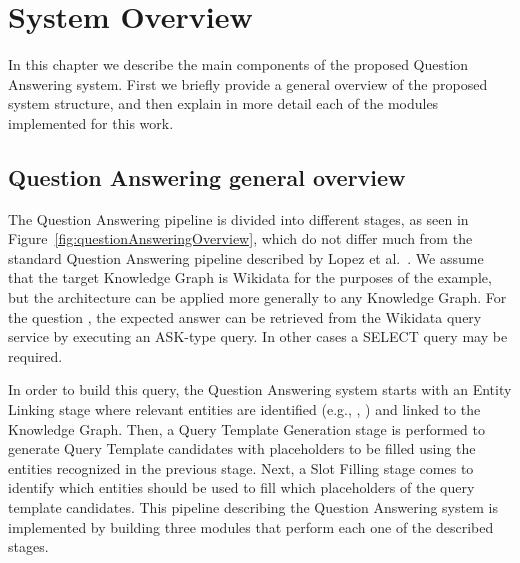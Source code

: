 \chapter{System Overview}
\label{cap3:system}
In this chapter we describe the main components of the proposed Question Answering system. 
First we briefly provide a general overview of the proposed system structure, and then explain 
in more detail each of the modules implemented for this work.

\section{Question Answering general overview}
\label{cap3:system/qaPipeline}
The Question Answering pipeline is divided into different stages, as seen in 
Figure~\ref{fig:questionAnsweringOverview}, which do not differ much from the standard 
Question Answering pipeline described by Lopez et al.~\cite{qa:core-techniques-DiefenbachLSM18}. 
We assume that the target Knowledge Graph is Wikidata for the purposes of the example, but 
the architecture can be applied more generally to any Knowledge Graph. For the question 
, the expected answer can be retrieved from the 
Wikidata query service by executing an ASK-type \SPARQL{} query. In other cases a SELECT query may be 
required.

In order to build this \SPARQL{} query, the Question Answering system starts with an Entity 
Linking stage where relevant entities are identified (e.g., , 
) and linked to the Knowledge Graph. Then, a Query Template Generation stage 
is performed to generate \SPARQL{} Query Template candidates with placeholders to be filled 
using the entities recognized in the previous stage. Next, a Slot Filling stage comes to 
identify which entities should be used to fill which placeholders of the query template 
candidates. This pipeline describing the Question Answering system is implemented by building 
three modules that perform each one of the described stages. 

\newpage

